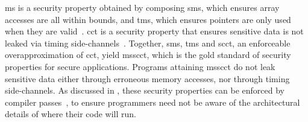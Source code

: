 \documentclass[dvipsnames,conference]{IEEEtran}
\theoremstyle{definition}
\begin{document}

\gls*{ms} is a security property obtained by composing \gls*{sms}, which ensures array accesses are all within bounds, and \gls*{tms}, which ensures pointers are only used when they are valid~\cite{azevedo2018meaningsofms,jim2002cyclone,necula2005ccured,nagarakatte2010cets,nagarakatte2009soft,akritidis2009baggy,michael2023mswasm}.
\gls*{cct} is a security property that ensures sensitive data is not leaked via timing side-channels~\cite{kocher1996timing}.
Together, \gls*{sms}, \gls*{tms} and \gls*{scct}, an enforceable overapproximation of \gls*{cct}, yield \gls*{msscct}, which is the gold standard of security properties for secure applications.
Programs attaining \gls*{msscct} do not leak sensitive data either through erroneous memory accesses, nor through timing side-channels.
As discussed in , these security properties can be enforced by compiler passes~\cite{bond2017vale,almeida2017jasmin}, to ensure programmers need not be aware of the architectural details of where their code will run.
\end{document}
